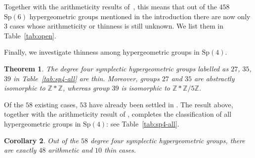 \documentclass[11pt,a4paper]{amsart}
\newtheorem{thm}{Theorem}
\newtheorem{cor}[thm]{Corollary}
\theoremstyle{definition}
\theoremstyle{definition}
\numberwithin{equation}{section}
\newcommand{\Sp}{\mathrm{Sp}}
\newcommand{\Jitendra}[2][]{\todo[#1,color=red!20]{JB: #2}}
\begin{document}
Together with the arithmeticity results of~\cite{SV, DFH, bdss, BDN22}, this means that out of the $458$ $\Sp(6)$ hypergeometric groups mentioned in the introduction there are now only $3$ cases whose arithmeticity or thinness is still unknown. We list them in Table~\ref{tab:open}.

Finally, we investigate thinness among hypergeometric groups in $\Sp(4)$. 

\begin{thm}\label{thm:total-sp4}
The degree four symplectic hypergeometric groups labelled as $27$, $35$, $39$ in Table~\ref{tab:sp4-all} are thin.
Moreover, groups $27$ and $35$ are abstractly isomorphic to $\mathbb{Z}\ast\mathbb{Z}$, whereas group $39$ is isomorphic to $\mathbb{Z}\ast\mathbb{Z}/5\mathbb{Z}$.
\end{thm}

Of the $58$ existing cases, $53$ have already been settled in \cite{SV, BT, S15S, S17, BSS}. The result above, together with the arithmeticity result of \cite{BDN22}, completes the classification of all hypergeometric groups in $\Sp(4)$: see Table~\ref{tab:sp4-all}.

\begin{cor}
Out of the $58$ degree four symplectic hypergeometric groups, there are exactly $48$ arithmetic and $10$ thin cases.
\end{cor}
\end{document}
